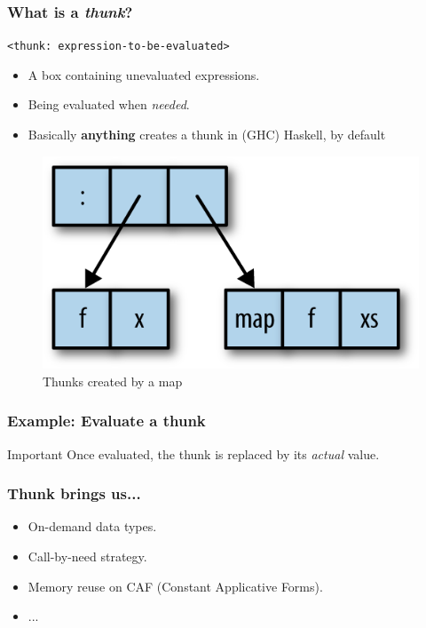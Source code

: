 \documentclass{beamer}
\newcommand{\inlinehaskell}[1]{\texttt{#1}}
\begin{document}
\begin{frame}
\frametitle{What is a \textit{thunk}?}
\inlinehaskell{<thunk: expression-to-be-evaluated>}
\begin{itemize}
    \item A box containing unevaluated expressions.
    \item Being evaluated when \textit{needed}.
    \item Basically \textbf{anything} creates a thunk in (GHC) Haskell, by default
\end{itemize}

\begin{figure}[hbt!]
\begin{center}
\includegraphics[height=0.4\textheight]{./pic/thunk-map.png}
\caption{Thunks created by a map}
\end{center}
\end{figure}
\end{frame}


\begin{frame}
\frametitle{Example: Evaluate a thunk}
\begin{block}{Important}
Once evaluated, the thunk is replaced by its \textit{actual} value.
\end{block}
\end{frame}


\begin{frame}
\frametitle{Thunk brings us...}
\begin{itemize}
    \item On-demand data types.
    \item Call-by-need strategy.
    \item Memory reuse on CAF (Constant Applicative Forms).
    \item ...
\end{itemize}\bigskip
{}
\end{frame}
\end{document}
